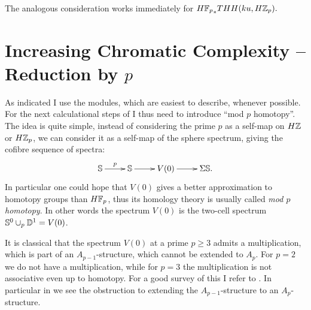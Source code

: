 The analogous consideration works immediately for ${H\F_p}_*THH(ku,H\Z_p).$
{}

\section{Increasing Chromatic Complexity -- Reduction by $p$}
As indicated I use the modules, which are easiest to describe, whenever
possible. For the next calculational steps of \cite{AuTHH} I thus need
to introduce ``mod $p$ homotopy''. The idea is quite simple, instead of
considering the prime $p$ as a self-map on $H\Z$ or $H\Z_p$, we can
consider it as a self-map of the sphere spectrum, giving the cofibre
sequence of spectra:
\[\xymatrix{\S\ar[r]^p&\S\ar[r]&V(0)\ar[r]&\Sigma\S.}\]
In particular one could hope that $V(0)$ gives a better approximation
to homotopy groups than $H\F_p$, thus its homology theory is
usually called \emph{mod $p$ homotopy}. In other words the spectrum
$V(0)$ is the two-cell spectrum $\S^0\cup_p \mathbb{D}^1=V(0)$.

It is classical that the spectrum $V(0)$ at a prime $p\geq 3$ admits
a multiplication, which is part of an $A_{p-1}$-structure, which
cannot be extended to $A_p$. For $p=2$ we do not
have a multiplication, while for $p=3$ the multiplication is 
not associative even up to homotopy. For a good survey of
this I refer to \cite{SchV0}. In particular in \cite[Theorem 2.5]{SchV0} we see the
obstruction to extending the $A_{p-1}$-structure to an $A_p$-structure.

